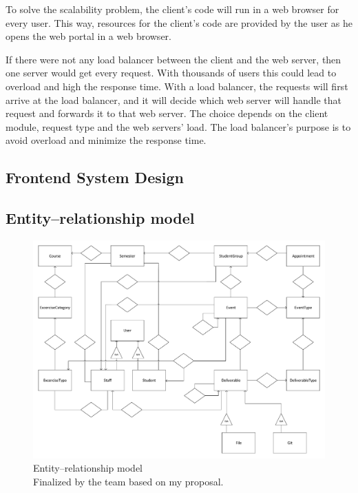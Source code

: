 
To solve the scalability problem, the client's code will run in a web browser for every user. This way, resources for the client's code are provided by the user as he opens the web portal in a web browser.
 

If there were not any load balancer between the client and the web server, then one server would get every request. With thousands of users this could lead to overload and high the response time. With a load balancer, the requests will first arrive at the load balancer, and it will decide which web server will handle that request and forwards it to that web server. The choice depends on the client module, request type and the web servers' load. The load balancer's purpose is to avoid overload and minimize the response time.
 
\subsection{Frontend System Design}

\subsection{Entity–relationship model}
\label{ER-model}

\begin{figure}[!htbp]
	\includegraphics[width=0.85\textheight, angle=90]{figures/ER.pdf}
	\caption[Entity–relationship model]{Entity–relationship model\\Finalized by the team based on my proposal.}
	\label{fig:er}
\end{figure}


